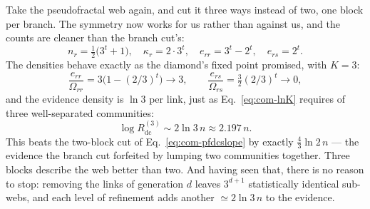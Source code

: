 Take the pseudofractal web again, and cut it three ways instead of two, one block
per branch. The symmetry now works for us rather than against us, and the counts
are cleaner than the branch cut's:
\begin{equation}
  n_r = \tfrac{1}{2}\big(3^{t}+1\big), \quad
  \kappa_r = 2\cdot 3^{t}, \quad
  e_{rr} = 3^{t}-2^{t}, \quad
  e_{rs} = 2^{t}.
  \label{eq:com-three}
\end{equation}
The densities behave exactly as the diamond's fixed point promised, with $K=3$:
\begin{equation}
  \frac{e_{rr}}{\Omega_{rr}} = 3\big(1-(2/3)^{t}\big)\to 3,
  \qquad
  \frac{e_{rs}}{\Omega_{rs}} = \tfrac{3}{2}(2/3)^{t}\to 0,
  \label{eq:com-threeratios}
\end{equation}
and the evidence density is $\ln 3$ per link, just as Eq.~\eqref{eq:com-lnK}
requires of three well-separated communities:
\begin{equation}
  \log R_{\mathrm{dc}}^{(3)} \sim 2\ln 3\,n \approx 2.197\,n .
  \label{eq:com-slope3}
\end{equation}
This beats the two-block cut of Eq.~\eqref{eq:com-pfdcslope} by exactly
$\tfrac{4}{3}\ln 2\,n$ --- the evidence the branch cut forfeited by lumping two
communities together. Three blocks describe the web better than two. And having
seen that, there is no reason to stop: removing the links of generation $d$ leaves
$3^{d+1}$ statistically identical sub-webs, and each level of refinement adds
another $\simeq2\ln3\,n$ to the evidence.

